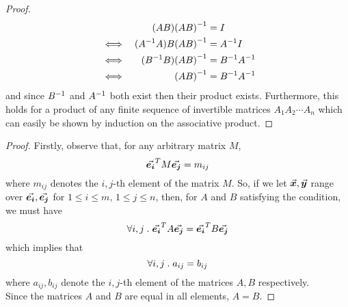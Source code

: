 \documentclass[../MathsNotesBase.tex]{subfiles}
\begin{document}
{		\medskip
		\begin{proof}
		\begin{align*}
		& 	  &	(AB){(AB)}^{-1} &= I \\
		&\iff &	({A}^{-1}A)B{(AB)}^{-1} &= {A}^{-1}I \\
		&\iff &	({B}^{-1}B){(AB)}^{-1} &= {B}^{-1}{A}^{-1} \\
		&\iff &	{(AB)}^{-1} &= {B}^{-1}{A}^{-1} \\
		\end{align*}
		and since ${B}^{-1}$ and ${A}^{-1}$ both exist then their product exists.
		Furthermore, this holds for a product of any finite sequence of invertible matrices $A_1A_2\cdots A_n$ which can easily be shown by induction on the associative product.
		\end{proof}
	
		\bigskip
		\begin{proof}
			Firstly, observe that, for any arbitrary matrix $M$,
			\[ \vec{\bm{e_i}}^T M \vec{\bm{e_j}} = m_{ij} \]
			where $m_{ij}$ denotes the $i,j$-th element of the matrix $M$. So, if we let ${ \vec{\bm{x}},\vec{\bm{y}} }$ range over ${ \vec{\bm{e_i}},\vec{\bm{e_j}} }$ for ${ 1 \leq i \leq m, \, 1 \leq j \leq n }$, then, for $A$ and $B$ satisfying the condition, we must have
			\[ \forall i,j \;.\; \vec{\bm{e_i}}^T A \vec{\bm{e_j}} = \vec{\bm{e_i}}^T B \vec{\bm{e_j}} \]
			which implies that
			\[ \forall i,j \;.\; a_{ij} = b_{ij} \]
			where $a_{ij}, b_{ij}$ denote the $i,j$-th element of the matrices $A,B$ respectively.\\
			
			Since the matrices $A$ and $B$ are equal in all elements, ${ A = B }$.
		\end{proof}
	}


\end{document}
